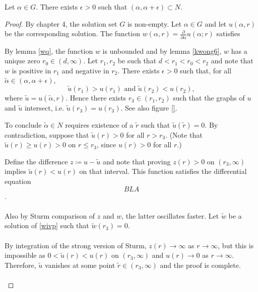 \begin{lemma} Let $\alpha\in G$. There exists $\epsilon>0$ such that $(\alpha,\alpha+\epsilon)\subset N$.
\begin{proof} By chapter 4, the solution set $G$ is non-empty. Let $\alpha\in G$ and let $u(\alpha,r)$ be the corresponding solution.  The function $w(\alpha,r)=\frac{\partial}{\partial\alpha}u(\alpha;r)$ satisfies

By lemma \ref{wq}, the function $w$ is unbounded and by lemma \ref{kwong6}, $w$ has a unique zero $r_0\in(d,\infty)$. Let $r_1,r_2$ be such that $d<r_1<r_0<r_2$ and note that $w$ is positive in $r_1$ and negative in $r_2$. There exists $\epsilon>0$ such that, for all $\tilde\alpha\in(\alpha,\alpha+\epsilon)$,$$\tilde u(r_1)>u(r_1)\text{ and }\tilde u(r_2)<u(r_2),$$ where $\tilde u=u(\tilde\alpha,r)$. Hence there exists $r_3\in(r_1,r_2)$ such that the graphs of $u$ and $\tilde u$ intersect, i.e. $\tilde u(r_3)=u(r_3)$. See also figure \ref{}.

To conclude $\tilde\alpha\in N$ requires existence of a $\tilde r$ such that $\tilde u(\tilde r)=0$. By contradiction, suppose that $\tilde u(r)>0$ for all $r>r_3$. (Note that $\tilde u(r)\geq u(r)>0$ on $r\leq r_3$, since $u(r)>0$ for all $r$.)

Define the difference $z\coloneqq u-\tilde u$ and note that proving $z(r)>0$ on $(r_3,\infty)$ implies $\tilde u(r)<u(r)$ on that interval. This function satisfies the differential equation $$\label{zivp} BLA $$.
\\
\\
Also by Sturm comparison of $z$ and $w$, the latter oscillates faster. Let $\tilde w$ be a solution of \eqref{wivp} such that $\tilde w(r_3)=0$. 
\\
\\
By integration of the strong version of Sturm, $z(r)\to\infty$ as $r\to\infty$, but this is impossible as $0<\tilde u(r)<u(r)$ on $(r_3,\infty)$ and $u(r)\to0$ as $r\to\infty$. Therefore, $\tilde u$ vanishes at some point $\tilde r\in(r_3,\infty)$ and the proof is complete.
\\
\\  \end{proof}
\end{lemma}